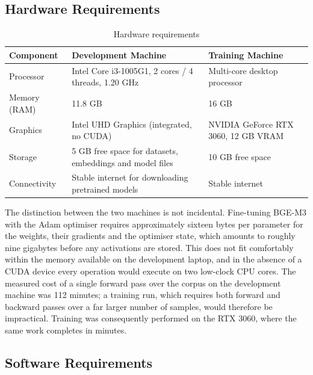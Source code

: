 \documentclass[12pt,a4paper]{article}
\begin{document}
\subsection{Hardware Requirements}

\begin{center}
\renewcommand{\arraystretch}{1.35}

\begin{table}[htbp]
\centering
\caption{Hardware requirements}
\label{tab:hardware}
\begin{tabular}{|p{3.6cm}|p{5.2cm}|p{5.2cm}|}
\hline
\textbf{Component} & \textbf{Development Machine} & \textbf{Training Machine} \\
\hline
Processor & Intel Core i3-1005G1, 2 cores / 4 threads, 1.20 GHz & Multi-core desktop processor \\
\hline
Memory (RAM) & 11.8 GB & 16 GB \\
\hline
Graphics & Intel UHD Graphics (integrated, no CUDA) & NVIDIA GeForce RTX 3060, 12 GB VRAM \\
\hline
Storage & 5 GB free space for datasets, embeddings and model files & 10 GB free space \\
\hline
Connectivity & Stable internet for downloading pretrained models & Stable internet \\
\hline
\end{tabular}
\end{table}
\end{center}

\vspace{0.3cm}

The distinction between the two machines is not incidental. Fine-tuning BGE-M3 with the Adam optimiser requires approximately sixteen bytes per parameter for the weights, their gradients and the optimiser state, which amounts to roughly nine gigabytes before any activations are stored. This does not fit comfortably within the memory available on the development laptop, and in the absence of a CUDA device every operation would execute on two low-clock CPU cores. The measured cost of a single forward pass over the corpus on the development machine was 112 minutes; a training run, which requires both forward and backward passes over a far larger number of samples, would therefore be impractical. Training was consequently performed on the RTX 3060, where the same work completes in minutes.

\subsection{Software Requirements}
\end{document}
